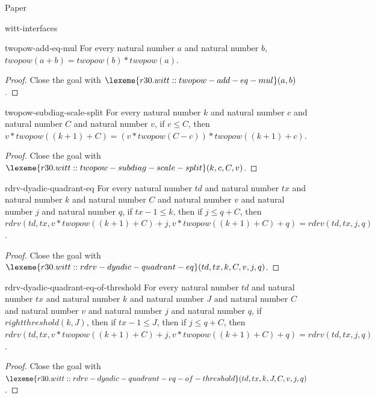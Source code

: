 \begin{lexlean}{Paper}
\begin{section}{witt-interfaces}
  \begin{theorem}{twopow-add-eq-mul}
  For every natural number \(a\) and natural number \(b\), \(twopow(a + b) = twopow(b) * twopow(a)\).
  \begin{proof}
  Close the goal with \(\lexeme{r30.witt::twopow-add-eq-mul}(a, b)\).
  \end{proof}
  \end{theorem}

  \begin{theorem}{twopow-subdiag-scale-split}
  For every natural number \(k\) and natural number \(c\) and natural number \(C\) and natural number \(v\), if \(c ≤ C\), then \(v * twopow((k + 1) + C) = (v * twopow(C - c)) * twopow((k + 1) + c)\).
  \begin{proof}
  Close the goal with \(\lexeme{r30.witt::twopow-subdiag-scale-split}(k, c, C, v)\).
  \end{proof}
  \end{theorem}

  \begin{theorem}{rdrv-dyadic-quadrant-eq}
  For every natural number \(td\) and natural number \(tx\) and natural number \(k\) and natural number \(C\) and natural number \(v\) and natural number \(j\) and natural number \(q\), if \(tx - 1 ≤ k\), then if \(j ≤ q + C\), then \(rdrv(td, tx, v * twopow((k + 1) + C) + j, v * twopow((k + 1) + C) + q) = rdrv(td, tx, j, q)\).
  \begin{proof}
  Close the goal with \(\lexeme{r30.witt::rdrv-dyadic-quadrant-eq}(td, tx, k, C, v, j, q)\).
  \end{proof}
  \end{theorem}

  \begin{theorem}{rdrv-dyadic-quadrant-eq-of-threshold}
  For every natural number \(td\) and natural number \(tx\) and natural number \(k\) and natural number \(J\) and natural number \(C\) and natural number \(v\) and natural number \(j\) and natural number \(q\), if \(rightthreshold(k, J)\), then if \(tx - 1 ≤ J\), then if \(j ≤ q + C\), then \(rdrv(td, tx, v * twopow((k + 1) + C) + j, v * twopow((k + 1) + C) + q) = rdrv(td, tx, j, q)\).
  \begin{proof}
  Close the goal with \(\lexeme{r30.witt::rdrv-dyadic-quadrant-eq-of-threshold}(td, tx, k, J, C, v, j, q)\).
  \end{proof}
  \end{theorem}


\end{section}
\end{lexlean}
